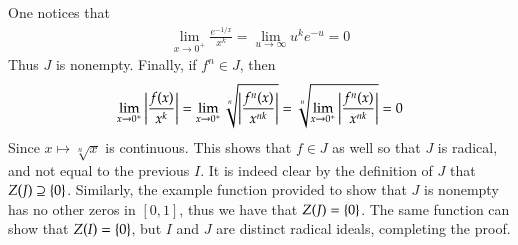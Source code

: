 \documentclass[12pt]{article}
\theoremstyle{definitionstyle}
\newcommand{\SET}[1]{\Set{\mskip-\medmuskip #1 \mskip-\medmuskip}}
\begin{document}
    One notices that
    \begin{align*}
        \lim_{x \to 0^+} \frac{e^{-1/x}}{x^k} = \lim_{u \to \infty} u^k e^{-u} = 0
    \end{align*}
    Thus $J$ is nonempty. Finally, if $f^n \in J$, then
    \begin{align*}
        \lim_{x \to 0^+} \qty|\frac{f(x)}{x^k}| = \lim_{x \to 0^+} \sqrt[n]{\qty|\frac{f^n(x)}{x^{nk}}|} = \sqrt[n]{\lim_{x \to 0^+}\qty|\frac{f^n(x)}{x^{nk}}|} = 0
    \end{align*}
    Since $x \mapsto \sqrt[n]{x}$ is continuous. This shows that $f \in J$ as well so that $J$ is radical, and not equal to the previous $I$. It is indeed clear by the definition of $J$ that $Z(J) \supseteq \SET{0}$. Similarly, the example function provided to show that $J$ is nonempty has no other zeros in $[0,1]$, thus we have that $Z(J) = \SET{0}$. The same function can show that $Z(I) = \SET{0}$, but $I$ and $J$ are distinct radical ideals, completing the proof.
\end{document}
